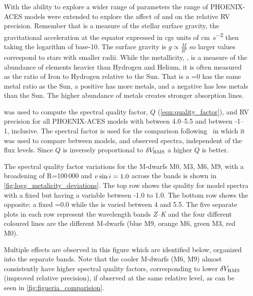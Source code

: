 With the ability to explore a wider range of parameters the range of {PHOENIX-ACES} models were extended to explore the affect of \Logg{} and \feh{} on the relative {RV} precision.
Remember that \Logg{} is a measure of the stellar surface gravity, the gravitational acceleration at the equator expressed in {cgs} units of \si{\centi\metre\per\second\squared} then taking the logarithm of base-10.
The surface gravity is \(g \propto \frac{M}{R^{2}}\) so larger \Logg{} values correspond to stars with smaller radii.
While the metallicity, \feh{}, is a measure of the abundance of elements heavier than Hydrogen and Helium, it is often measured as the ratio of Iron to Hydrogen relative to the Sun.
That is a \feh{}=0 has the same metal ratio as the Sun, a positive \feh{} has more metals, and a negative \feh{} has less metals than the Sun.
The higher abundance of metals creates stronger absorption lines.

\Eniric{} was used to compute the spectral quality factor, \(Q\) (\cref{eqn:quality_factor}), and {RV} precision for all {PHOENIX-ACES} models with \Logg{} between 4.0--5.5 and \feh{} between -1--1, inclusive.
The spectral factor is used for the comparison following~\citet{artigau_optical_2018} in which it was used to compare between models, and observed spectra, independent of the flux levels.
Since \(Q\) is inversely proportional to \(\delta V_{\textrm{RMS}}\) a higher \(Q\) is better.

The spectral quality factor variations for the {M-dwarf}s {M0}, {M3}, {M6}, {M9}, with a broadening of R=100\,000 and $v\sin{i}=1.0$\kmps{} across the \nir{} bands is shown in \cref{fig:logg_metalicity_deviations}.
The top row shows the quality for model spectra with a fixed  but having a variable \feh{} between -1.0 to 1.0.
The bottom row shows the opposite: a fixed \feh{}=0.0 while the \Logg{} is varied between 4 and 5.5.
The five separate plots in each row represent the \nir{} wavelength bands \emph{Z}--\emph{K} and the four different coloured lines are the different M-dwarfs (blue {M9}, orange {M6}, green {M3}, red {M0}).

Multiple effects are observed in this figure which are identified below, organized into the separate bands.
Note that the cooler M-dwarfs (M6, {M9}) almost consistently have higher spectral quality factors, corresponding to lower \({\delta V_{\textrm{RMS}}{}}\) (improved relative precision), if observed at the same relative \snr{} level, as can be seen in \cref{fig:figueria_comparision}.

